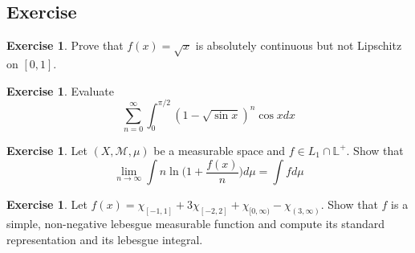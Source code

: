 \documentclass[	DIV=calc,paper=a4,fontsize=11pt]{scrartcl}	 	%
\theoremstyle{definition}
\newtheorem{exer}[thm]{Exercise}
\theoremstyle{plain}
\theoremstyle{remark}
\begin{document}
\newpage
\subsection{Exercise}

\begin{exer}\label{091}
Prove that $f(x)=\sqrt{x}$ is absolutely continuous but not Lipschitz on $[0,1]$.
\end{exer}

\begin{exer}\label{092}
Evaluate
\[\sum_{n=0}^{\infty}\int_{0}^{\pi/2}(1-\sqrt{\sin x})^n\cos xdx\]
\end{exer}

\begin{exer}\label{093}
Let $(X,\mathcal{M},\mu)$ be a measurable space and $f\in L_1\cap\mathbb{L}^+$. Show that
\[\lim_{n\to\infty} \int n\ln\biggl(1+\frac{f(x)}{n}\biggl)d\mu=\int f d\mu\]
\end{exer}

\begin{exer}\label{094}
Let $f(x)=\chi_{[-1,1]}+3\chi_{[-2,2]}+\chi_{[0,\infty)}-\chi_{(3,\infty)}$. Show that $f$ is a simple, non-negative lebesgue measurable function and compute its standard representation and its lebesgue integral.
\end{exer}

\newpage
\end{document}
